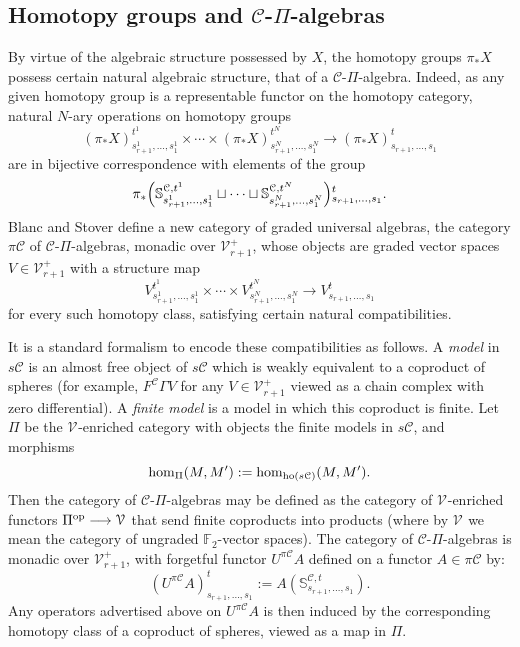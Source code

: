 \documentclass[11pt]{amsart} \renewcommand{\baselinestretch}{1.4}
\theoremstyle{plain}
\theoremstyle{definition}
\renewcommand{\to}{\longrightarrow}
\newcommand{\calV}{\mathcal{V}}
\newcommand{\calc}{\mathcal{C}}
\newcommand{\vect}[2]{\calV^{#1}_{#2}}
\newcommand{\PA}[1]{\pi#1}
\newcommand{\F}{\mathbb{F}}
\newcommand{\Ftwo}{\F_2}
\begin{document}
\begin{Pi-algebras and cohomology algebras}
\subsection{Homotopy groups and $\calc$-$\Pi$-algebras}\label{homotopy and pialgs}
By virtue of the algebraic structure possessed by $X$, the homotopy groups $\pi_*X$ possess certain natural algebraic structure, that of a $\calc$-$\Pi$-algebra. Indeed, as any given homotopy group is a representable functor on the homotopy category, natural $N$-ary operations on homotopy groups
\[(\pi_*X)_{s_{r+1}^{1},\ldots,s_{1}^{1}}^{t^1}\times\cdots \times(\pi_*X)_{s_{r+1}^{N},\ldots,s_{1}^{N}}^{t^N}\to (\pi_*X)_{s_{r+1},\ldots,s_{1}}^{t}\]
are in bijective correspondence with elements of the group
\[ \pi_*\Bigl(\mathbb{S}^{\calc,t^1}_{s_{r+1}^{1},\ldots,s_{1}^{1}}\sqcup\cdots\sqcup \mathbb{S}^{\calc,t^N}_{s_{r+1}^{N},\ldots,s_{1}^{N}}\Bigr)\makebox[0cm][l]{}_{s_{r+1},\ldots,s_{1}}^{t}.\]
Blanc and Stover \cite{Blanc_Stover-Groth_SS.pdf} define a new category of graded universal algebras, the category $\PA{\calc}$ of $\calc$-$\Pi$-algebras, monadic over $\vect{+}{r+1}$, whose objects are graded vector spaces $V\in\vect{+}{r+1}$ with a structure map 
\[V_{s_{r+1}^{1},\ldots,s_{1}^{1}}^{t^1}\times\cdots \times V_{s_{r+1}^{N},\ldots,s_{1}^{N}}^{t^N}\to V_{s_{r+1},\ldots,s_{1}}^{t}\]
for every such homotopy class, satisfying certain natural compatibilities.

It is a standard formalism to encode these compatibilities as follows. A \emph{model}  \cite{Blanc_Stover-Groth_SS.pdf} in $s\calc$ is 
an almost free object of $s\calc$ which is weakly equivalent to a coproduct of spheres (for example, $F^{\calc}\Gamma V$ for any $V\in\vect{+}{r+1}$ viewed as a chain complex with zero differential). A \emph{finite model} is a model in which this coproduct is finite. Let $\Pi$  be the $\vect{}{}$-enriched category with objects the finite models in $s\calc$, and morphisms
\[\hom_{\Pi}(M,M'):=\hom_{\textup{ho}(s\calc)}(M,M').\]
Then the category of $\calc$-$\Pi$-algebras  may be defined as the category of $\vect{}{}$-enriched functors $\Pi^\textup{op}\to \vect{}{}$ that send finite coproducts into products (where by $\vect{}{}$ we mean the category of ungraded $\Ftwo $-vector spaces). The category of $\calc$-$\Pi$-algebras is monadic over $\vect{+}{r+1}$, with  forgetful functor $U^{\PA{\calc}}A$ defined on a functor $A\in \PA{\calc}$ by:%
\[(U^{\PA{\calc}}A)^t_{s_{r+1},\ldots,s_1}:=A(\mathbb{S}^{\calc,t}_{s_{r+1},\ldots,s_{1}}).\]
Any operators advertised above on $U^{\PA{\calc}}A$ is then induced by the corresponding homotopy class of a coproduct of spheres, viewed as a map in $\Pi$. %


\end{Pi-algebras and cohomology algebras}
\end{document}
